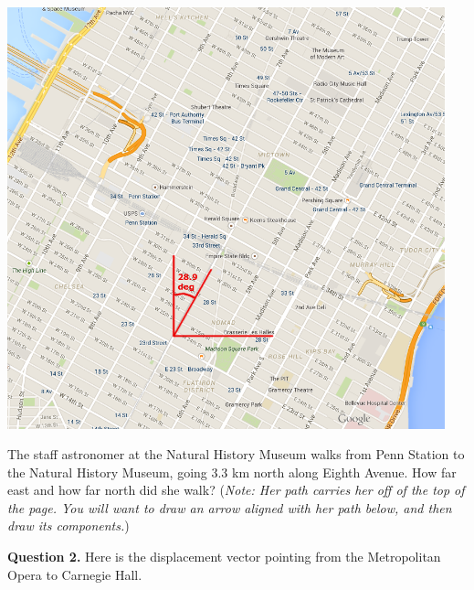 \documentclass[12pt]{article}
\def\BS{\bigskip}
\begin{document}
\begin{minipage}{0.6\textwidth}
	\begin{center}
	
	
	\includegraphics[width=0.95\textwidth]{manhattan-1.png}
	

\end{center}
\end{minipage}
\BS\BS

The staff astronomer at the Natural History Museum walks from Penn Station to the Natural History Museum, going 3.3 km north along Eighth Avenue. How far east and how far north did she walk? ({\it Note: Her path carries her off of the top of the page. You will want to draw an arrow aligned with her path below, and then draw its components.})

\vspace{3in}

	


\newpage


{\bf Question 2.} Here is the displacement vector pointing from the Metropolitan Opera to Carnegie Hall.
	\BS
	
\end{document}
